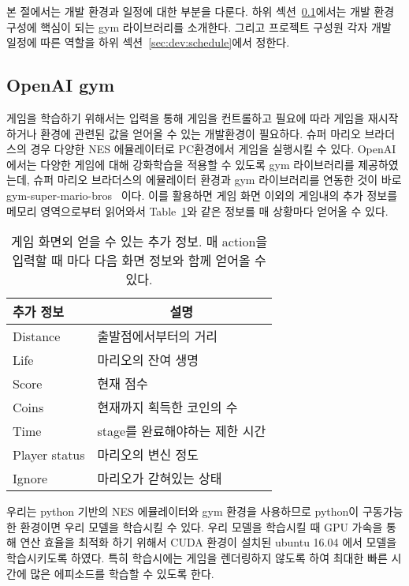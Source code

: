 
본 절에서는 개발 환경과 일정에 대한 부분을 다룬다.
하위 섹션~\ref{sec:dev:gym}에서는 개발 환경 구성에 핵심이 되는 gym 라이브러리를 소개한다.
그리고 프로젝트 구성원 각자 개발 일정에 따른 역할을 하위 섹션~\ref{sec:dev:schedule}에서 정한다.

\subsection{OpenAI gym}
\label{sec:dev:gym}
게임을 학습하기 위해서는 입력을 통해 게임을 컨트롤하고 필요에 따라 게임을 재시작하거나 환경에 관련된 값을 얻어올 수 있는 개발환경이 필요하다.
슈퍼 마리오 브라더스의 경우 다양한 NES 에뮬레이터로 PC환경에서 게임을 실행시킬 수 있다.
OpenAI에서는 다양한 게임에 대해 강화학습을 적용할 수 있도록 gym 라이브러리를 제공하였는데, 슈퍼 마리오 브라더스의 에뮬레이터 환경과 gym 라이브러리를 연동한 것이 바로 gym-super-mario-bros~\cite{GYMMario} 이다.
이를 활용하면 게임 화면 이외의 게임내의 추가 정보를 메모리 영역으로부터 읽어와서 Table~\ref{tab:mario:info}와 같은 정보를 매 상황마다 얻어올 수 있다.

\begin{table}[h]
	\caption {
		게임 화면외 얻을 수 있는 추가 정보. 매 action을 입력할 때 마다 다음 화면 정보와 함께 얻어올 수 있다.
	}
	\label{tab:mario:info}
\begin{tabular}{ll}
\toprule
추가 정보      & \multicolumn{1}{c}{설명} \\
\midrule
Distance       & 출발점에서부터의 거리 \\
Life           & 마리오의 잔여 생명 \\
Score          & 현재 점수 \\
Coins          & 현재까지 획득한 코인의 수 \\
Time           & stage를 완료해야하는 제한 시간 \\
Player status  & 마리오의 변신 정도 \\
Ignore         & 마리오가 갇혀있는 상태 \\
\bottomrule
\end{tabular}
\end{table}

우리는 python 기반의 NES 에뮬레이터와 gym 환경을 사용하므로 python이 구동가능한 환경이면 우리 모델을 학습시킬 수 있다.
우리 모델을 학습시킬 때 GPU 가속을 통해 연산 효율을 최적화 하기 위해서 CUDA 환경이 설치된 ubuntu 16.04 에서 모델을 학습시키도록 하였다.
특히 학습시에는 게임을 렌더링하지 않도록 하여 최대한 빠른 시간에 많은 에피소드를 학습할 수 있도록 한다.

